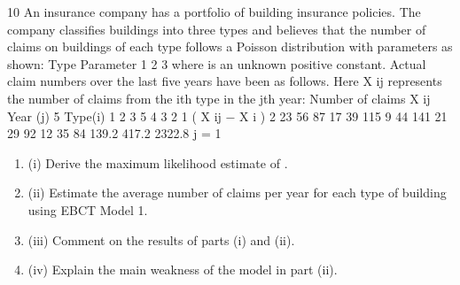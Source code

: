 \documentclass[a4paper,12pt]{article}
\begin{document}
10
An insurance company has a portfolio of building insurance policies. The company
classifies buildings into three types and believes that the number of claims on
buildings of each type follows a Poisson distribution with parameters as shown:
Type Parameter
1
2
3  \lambda
where \lambda is an unknown positive constant.
Actual claim numbers over the last five years have been as follows. Here X ij
represents the number of claims from the ith type in the jth year:
Number of claims X ij
Year (j)
5
Type(i)
1
2
3
5 4 3 2 1 \sum  ( X ij − X i ) 2
23
56
87 17
39
115 9
44
141 21
29
92 12
35
84 139.2
417.2
2322.8
j = 1
\begin{enumerate}
\item (i) Derive the maximum likelihood estimate of \lambda . 
\item (ii) Estimate the average number of claims per year for each type of building
using EBCT Model 1. 
\item (iii) Comment on the results of parts (i) and (ii). 
\item (iv) Explain the main weakness of the model in part (ii).
\end{enumerate}

\newpage
\end{document}
